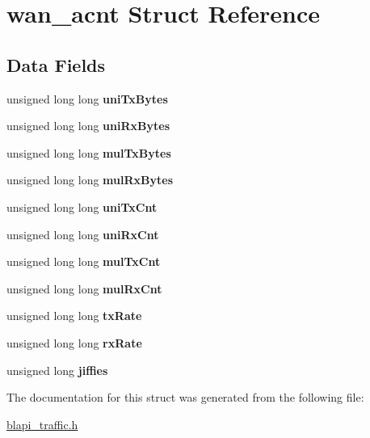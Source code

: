 \hypertarget{structwan__acnt}{}\section{wan\+\_\+acnt Struct Reference}
\label{structwan__acnt}
\subsection*{Data Fields}
\begin{DoxyCompactItemize}
\item 
\mbox{\label{structwan__acnt_ad77807a1f349c61fd9c9a2153bf5b2d7}} 
unsigned long long {\bfseries uni\+Tx\+Bytes}
\item 
\mbox{\label{structwan__acnt_ac807b53237be0861dfd0eabb0e94d97a}} 
unsigned long long {\bfseries uni\+Rx\+Bytes}
\item 
\mbox{\label{structwan__acnt_aba65ac2672cdbd3bac12b9e4e5a07bb2}} 
unsigned long long {\bfseries mul\+Tx\+Bytes}
\item 
\mbox{\label{structwan__acnt_adf975224e5f4e006096c9c2989519365}} 
unsigned long long {\bfseries mul\+Rx\+Bytes}
\item 
\mbox{\label{structwan__acnt_a53ad014b66f15b0da7e705f06cf5171b}} 
unsigned long long {\bfseries uni\+Tx\+Cnt}
\item 
\mbox{\label{structwan__acnt_ab3b6dc8bb7ac6daf356b61712d741673}} 
unsigned long long {\bfseries uni\+Rx\+Cnt}
\item 
\mbox{\label{structwan__acnt_ac3a62fa6d619c1f140a45de32e460c98}} 
unsigned long long {\bfseries mul\+Tx\+Cnt}
\item 
\mbox{\label{structwan__acnt_aba9098a9a9de1cb7dbf075ad376eabb7}} 
unsigned long long {\bfseries mul\+Rx\+Cnt}
\item 
\mbox{\label{structwan__acnt_a9cf237e32c662156bbb53438513152d9}} 
unsigned long long {\bfseries tx\+Rate}
\item 
\mbox{\label{structwan__acnt_ab7b180dde57d4dc301e6d73a8a43545b}} 
unsigned long long {\bfseries rx\+Rate}
\item 
\mbox{\label{structwan__acnt_a984917ed1e933fd269b347c6510f96fd}} 
unsigned long {\bfseries jiffies}
\end{DoxyCompactItemize}


The documentation for this struct was generated from the following file\+:\begin{DoxyCompactItemize}
\item 
\hyperlink{blapi__traffic_8h}{blapi\+\_\+traffic.\+h}\end{DoxyCompactItemize}
